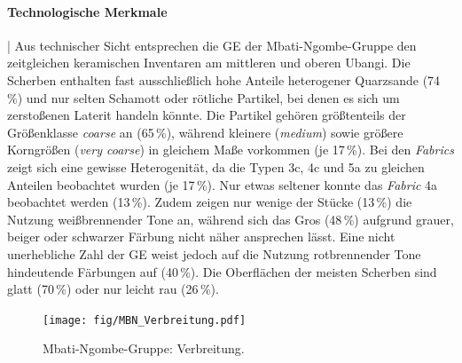 \paragraph{Technologische Merkmale}\hspace{-.5em}|\hspace{.5em}%
Aus technischer Sicht entsprechen die GE der Mbati-Ngombe-Gruppe den zeitgleichen keramischen Inventaren am mittleren und oberen \mbox{Ubangi}. Die Scherben enthalten fast ausschließlich hohe Anteile heterogener Quarzsande (74\,\%) und nur selten Schamott oder rötliche Partikel, bei denen es sich um zerstoßenen Laterit handeln könnte. Die Partikel gehören größtenteils der Größenklasse \textit{coarse} an (65\,\%), während kleinere (\textit{medium}) sowie größere Korngrößen (\textit{very coarse}) in gleichem Maße vorkommen (je 17\,\%). Bei den \textit{Fabrics} zeigt sich eine gewisse Heterogenität, da die Typen 3c, 4c und 5a zu gleichen Anteilen beobachtet wurden (je 17\,\%). Nur etwas seltener konnte das \textit{Fabric} 4a beobachtet werden (13\,\%). Zudem zeigen nur wenige der Stücke (13\,\%) die Nutzung weißbrennender Tone an, während sich das Gros (48\,\%) aufgrund grauer, beiger oder schwarzer Färbung nicht näher ansprechen lässt. Eine nicht unerhebliche Zahl der GE weist jedoch auf die Nutzung rotbrennender Tone hindeutende Färbungen auf (40\,\%). Die Oberflächen der meisten Scherben sind glatt (70\,\%) oder nur leicht rau (26\,\%).

\begin{figure}[p]
	\centering
	\texttt{[image: fig/MBN\_Verbreitung.pdf]}
	\caption{Mbati-Ngombe-Gruppe: Verbreitung.}
	\label{fig:MBN_Verbreitung}
\end{figure}


